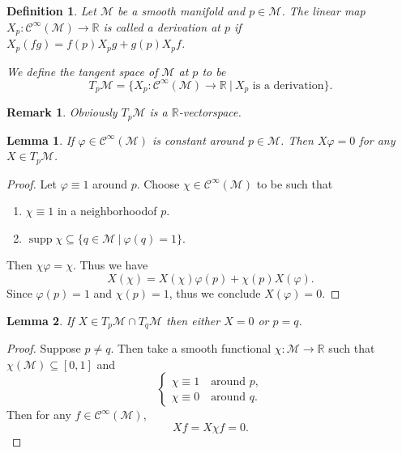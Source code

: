 \documentclass[8pt]{article}
\newtheorem{definition}{Definition}[section]
\newtheorem{lemma}{Lemma}[section]
\newtheorem{remark}{Remark}[section]
\DeclareMathOperator{\supp}{supp}
\newcommand{\R}[0]{\mathbb{R}}
\newcommand{\M}[0]{\mathcal{M}}
\newcommand{\cinf}[0]{\mathcal{C}^\infty}
\newcommand{\sep}[0]{\:|\:}
\begin{document}
\begin{definition}
Let $\mathcal{M}$ be a smooth manifold and $p\in\mathcal{M}$. The linear map $X_p:\mathcal{C}^\infty(\mathcal{M})\to\R$ is called a derivation at $p$ if 
$X_p(fg) = f(p)X_pg+g(p)X_pf$.
\par We define the tangent space of $\mathcal{M}$ at $p$ to be 
\begin{equation*}
T_p\mathcal{M} = \{X_p:\mathcal{C}^\infty(\mathcal{M})\to \R\sep \text{$X_p$ is a derivation}\}.
\end{equation*}
\end{definition}

\begin{remark}
  Obviously $T_p\mathcal{M}$ is a $\R$-vectorspace.
\end{remark}



\begin{lemma}
  If $\varphi\in\mathcal{C}^\infty(\mathcal{M})$ is constant around $p\in\mathcal{M}$. Then $X\varphi = 0$ for any $X\in T_p\M$. 
\end{lemma}
\begin{proof}
Let $\varphi\equiv 1$ around $p$. Choose $\chi\in\cinf(\M)$ to be such that 
\begin{enumerate}
  \item $\chi\equiv1$ in a neighborhoodof $p$.
  \item $\supp\chi\subseteq\{q\in\M\sep\varphi(q)=1\}$.
\end{enumerate}
Then $\chi\varphi = \chi$. Thus we have 
\begin{equation*}
  X(\chi) = X(\chi)\varphi(p) + \chi(p)X(\varphi).
\end{equation*}
Since $\varphi(p) = 1$ and $\chi(p)=1$, thus we conclude $X(\varphi) = 0$. 
\end{proof}

\begin{lemma}
  If $X\in T_p\M\cap T_q\M$ then either $X=0$ or $p=q$. 
\end{lemma}

\begin{proof}
  Suppose $p\not=q$. Then take a smooth functional $\chi:\M\to\R$ such that $\chi(\M)\subseteq[0,1]$ and 
  \begin{equation*}
    \begin{cases}
      \chi \equiv 1 \quad \text{around $p$},\\
      \chi \equiv 0 \quad \text{around $q$}.
    \end{cases}
  \end{equation*}
  Then for any $f\in\cinf(\M)$,
  \begin{equation*}
    Xf = X\chi f = 0.
  \end{equation*}
\end{proof}
\end{document}
